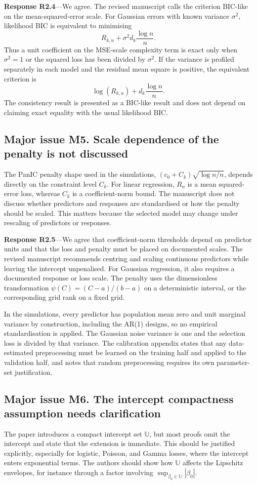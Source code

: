 \documentclass[11pt]{article}
\newcommand{\response}[1]{\par\noindent\textbf{Response #1}---}
\begin{document}
\response{R2.4}We agree. The revised manuscript calls the criterion BIC-like on the mean-squared-error scale. For Gaussian errors with known variance $\sigma^2$, likelihood BIC is equivalent to minimising
\[
R_{k,n}+\sigma^2d_k\frac{\log n}{n}.
\]
Thus a unit coefficient on the MSE-scale complexity term is exact only when $\sigma^2=1$ or the squared loss has been divided by $\sigma^2$. If the variance is profiled separately in each model and the residual mean square is positive, the equivalent criterion is
\[
\log(R_{k,n})+d_k\frac{\log n}{n}.
\]
The consistency result is presented as a BIC-like result and does not depend on claiming exact equality with the usual likelihood BIC.

\subsection*{Major issue M5. Scale dependence of the penalty is not discussed}
The PanIC penalty shape used in the simulations, $(c_0+C_k)\sqrt{\log n/n}$, depends directly on the constraint level $C_k$. For linear regression, $R_n$ is a mean squared-error loss, whereas $C_k$ is a coefficient-norm bound. The manuscript does not discuss whether predictors and responses are standardised or how the penalty should be scaled. This matters because the selected model may change under rescaling of predictors or responses.

\response{R2.5}We agree that coefficient-norm thresholds depend on predictor units and that the loss and penalty must be placed on documented scales. The revised manuscript recommends centring and scaling continuous predictors while leaving the intercept unpenalised. For Gaussian regression, it also requires a documented response or loss scale. The penalty uses the dimensionless transformation $\psi(C)=(C-a)/(b-a)$ on a deterministic interval, or the corresponding grid rank on a fixed grid.

In the simulations, every predictor has population mean zero and unit marginal variance by construction, including the AR(1) designs, so no empirical standardisation is applied. The Gaussian noise variance is one and the selection loss is divided by that variance. The calibration appendix states that any data-estimated preprocessing must be learned on the training half and applied to the validation half, and notes that random preprocessing requires its own parameter-set justification.

\subsection*{Major issue M6. The intercept compactness assumption needs clarification}
The paper introduces a compact intercept set $\mathbb U$, but most proofs omit the intercept and state that the extension is immediate. This should be justified explicitly, especially for logistic, Poisson, and Gamma losses, where the intercept enters exponential terms. The authors should show how $\mathbb U$ affects the Lipschitz envelopes, for instance through a factor involving $\sup_{\beta_0\in\mathbb U}|\beta_0|$.
\end{document}

